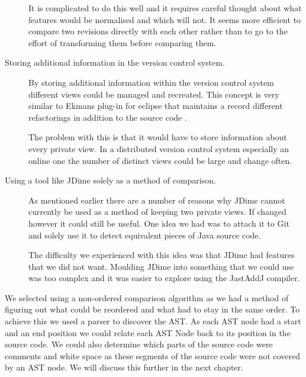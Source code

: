 \begin{description}
    It is complicated to do this well and it requires careful thought about what features would be normalised and which will not.
    It seems more efficient to compare two revisions directly with each other rather than to go to the effort of transforming them before comparing them. 
  \item [Storing additional information in the version control system.]
    By storing additional information within the version control system different views could be managed and recreated.
    This concept is very similar to Ekmans plug-in for eclipse that maintains a record different refactorings in addition to the source code \cite{Ekman2004}.

    The problem with this is that it would have to store information about every private view.  In a distributed version control system especially an online one the number of distinct views could be large and change often.   
  
  \item [Using a tool like JDime solely as a method of comparison.]
    As mentioned earlier there are a number of reasons why JDime cannot currently be used as a method of keeping two private views. If changed however it could still be useful.  One idea we had was to attach it to Git and solely use it to detect equivalent pieces of Java source code.

    The difficulty we experienced with this idea was that JDime had features that we did not want.  Moulding JDime into something that we could use was too complex and it was easier to explore using the JastAddJ compiler. 
\end{description}

We selected using a non-ordered comparison algorithm as we had a method of figuring out what could be reordered and what had to stay in the same order.  To achieve this we used a parser to discover the AST.  As each AST node had a start and an end position we could relate each AST Node back to its position in the source code.  We could also determine which parts of the source code were comments and white space as these segments of the source code were not covered by an AST node. We will discuss this further in the next chapter.

